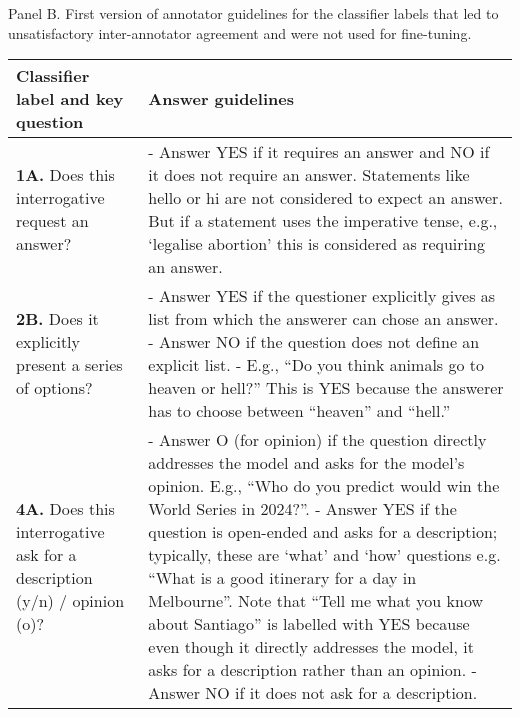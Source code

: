 \documentclass{article}
\begin{document}
\begin{adjustwidth}{0.75cm}{0.75cm}
\noindent Panel B. First version of annotator guidelines for the classifier labels that led to unsatisfactory inter-annotator agreement and were not used for fine-tuning.
\end{adjustwidth}

\vspace{1em}
{\small
\renewcommand{\arraystretch}{1.2}
\begin{tabular}{p{5.5cm} p{12.5cm}}
\toprule
\textbf{Classifier label and key question} & \textbf{Answer guidelines} \\
\midrule

\textbf{1A.} Does this interrogative request an answer? & 
- Answer YES if it requires an answer and NO if it does not require an answer. Statements like hello or hi are not considered to expect an answer. But if a statement uses the imperative tense, e.g., ‘legalise abortion’ this is considered as requiring an answer. \\
\addlinespace[0.8em]

\textbf{2B.} Does it explicitly present a series of options? & 
- Answer YES if the questioner explicitly gives as list from which the answerer can chose an answer. \newline
- Answer NO if the question does not define an explicit list. \newline
- E.g., “Do you think animals go to heaven or hell?” This is YES because the answerer has to choose between “heaven” and “hell.” \\
\addlinespace[0.8em]

\textbf{4A.} Does this interrogative ask for a description (y/n) / opinion (o)? & 
- Answer O (for opinion) if the question directly addresses the model and asks for the model’s opinion. E.g., “Who do you predict would win the World Series in 2024?”. \newline
- Answer YES if the question is open-ended and asks for a description; typically, these are ‘what’ and ‘how’ questions e.g. “What is a good itinerary for a day in Melbourne”. Note that “Tell me what you know about Santiago” is labelled with YES because even though it directly addresses the model, it asks for a description rather than an opinion. \newline
- Answer NO if it does not ask for a description. \\

\bottomrule
\end{tabular}
}
\end{document}
